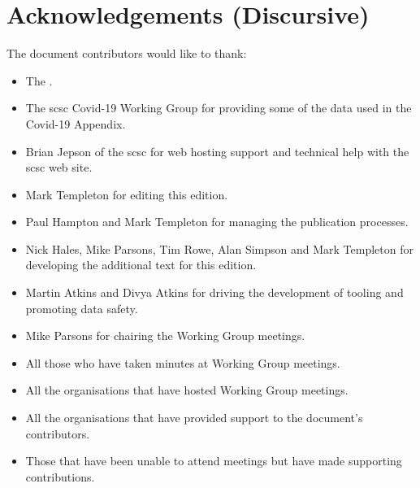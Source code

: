 %
%
\section{Acknowledgements (Discursive)} \label{bkm:acknowledgements}


The document contributors would like to thank:
\begin{itemize}
  \item The .
  \item The \gls{scsc} Covid-19 Working Group for providing some of the data used in the Covid-19 Appendix.
  \item Brian Jepson of the \gls{scsc} for web hosting support and technical help with the \gls{scsc} web site.
  \item
    Mark Templeton for editing this edition.
  \item Paul Hampton
    and
    Mark Templeton for managing the publication processes.
  \item
    \cbstart
    Nick Hales, Mike Parsons, Tim Rowe, Alan Simpson and Mark Templeton
    for developing the additional text for this edition.
    \cbend
  \item
    Martin Atkins and Divya Atkins for driving the development of tooling and promoting data safety.
  \item Mike Parsons for chairing the Working Group meetings.
  \item All those who have taken minutes at Working Group meetings.
  \item
    All the organisations that have hosted Working Group meetings.
  \item All the organisations that have provided support to the document's contributors.
  \item Those that have been unable to attend meetings but have made supporting contributions.
\end{itemize}
